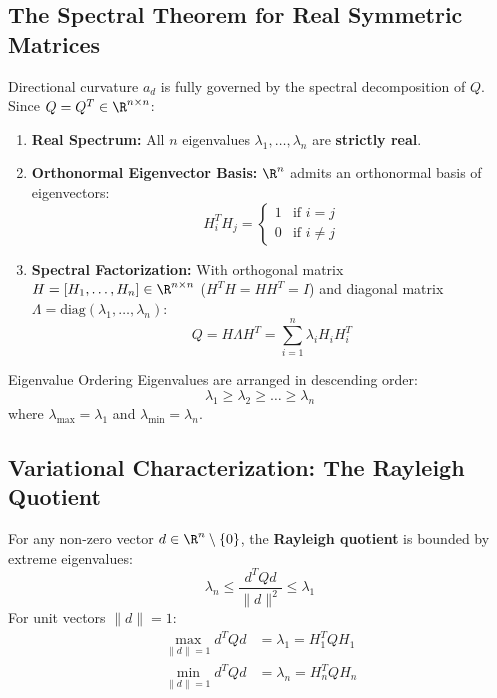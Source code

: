 \subsection{The Spectral Theorem for Real Symmetric Matrices}
Directional curvature $a_d$ is fully governed by the spectral decomposition of $Q$. Since $Q = Q^T \in \R^{n \times n}$:
\begin{enumerate}
    \item \textbf{Real Spectrum:} All $n$ eigenvalues $\lambda_1, \dots, \lambda_n$ are \textbf{strictly real}.
    \item \textbf{Orthonormal Eigenvector Basis:} $\R^n$ admits an orthonormal basis of eigenvectors:
    \begin{equation}
    H_i^T H_j = \begin{cases} 1 & \text{if } i = j \\ 0 & \text{if } i \neq j \end{cases}
    \end{equation}
    \item \textbf{Spectral Factorization:} With orthogonal matrix $H = [H_1, \dots, H_n] \in \R^{n \times n}$ ($H^T H = H H^T = I$) and diagonal matrix $\Lambda = \text{diag}(\lambda_1, \dots, \lambda_n)$:
    \begin{equation}
    Q = H \Lambda H^T = \sum_{i=1}^n \lambda_i H_i H_i^T
    \end{equation}
\end{enumerate}

\begin{noteblock}{Eigenvalue Ordering}
Eigenvalues are arranged in descending order:
\begin{equation}
\lambda_1 \ge \lambda_2 \ge \dots \ge \lambda_n
\end{equation}
where $\lambda_{\max} = \lambda_1$ and $\lambda_{\min} = \lambda_n$.
\end{noteblock}

\subsection{Variational Characterization: The Rayleigh Quotient}
For any non-zero vector $d \in \R^n \setminus \{0\}$, the \textbf{Rayleigh quotient} is bounded by extreme eigenvalues:
\begin{equation}
\lambda_n \le \frac{d^T Q d}{\|d\|^2} \le \lambda_1
\end{equation}
For unit vectors $\|d\| = 1$:
\begin{align}
\max_{\|d\|=1} d^T Q d &= \lambda_1 = H_1^T Q H_1 \\
\min_{\|d\|=1} d^T Q d &= \lambda_n = H_n^T Q H_n
\end{align}

